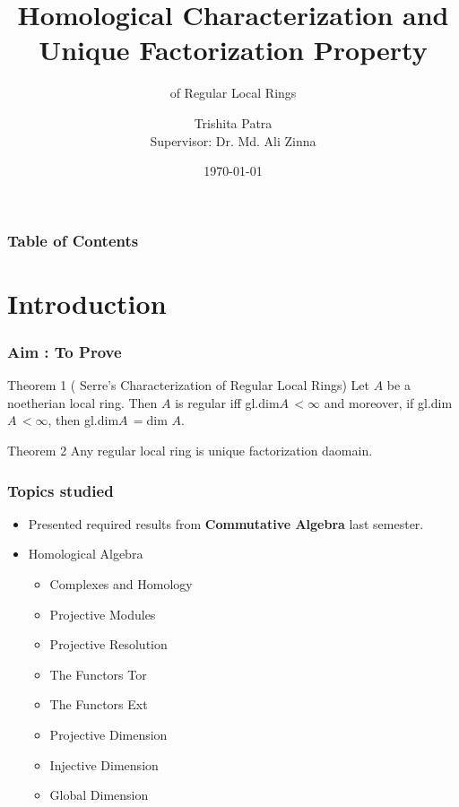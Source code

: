 \documentclass[
	11pt, %
]{beamer}
\title[Master's Thesis Presentation]{Homological Characterization and Unique Factorization Property}
\subtitle{ of Regular Local Rings }
\author[Trishita Patra]
{Trishita Patra\inst{} \\Supervisor: Dr. Md. Ali Zinna}
\institute[] %
{
  \inst{}%
  Department of Mathematics and Statistics (DMS)\\
  Indian Institute of Science Education and Research Kolkata (IISER Kolkata)
}
\date{\today }
\newcommand{\B}{\textbf}						%
\begin{document}
\frame{\titlepage}

\begin{frame}
\frametitle{Table of Contents}
\tableofcontents
\end{frame}

\section{Introduction}
\begin{frame}
\frametitle{Aim : To Prove}
\begin{block}{ Theorem 1 ( Serre's Characterization of Regular Local Rings)}
    Let $A$ be a noetherian local ring. Then $A$ is regular iff gl.dim$A\,<\infty$  and moreover, if gl.dim$A\,<\infty$, then gl.dim$A\,=$dim $A$.  
\end{block}
\pause
\vspace{0.5cm}
\begin{block}{ Theorem 2 }
    Any regular local ring is unique factorization daomain.
    
\end{block}
\end{frame}

\begin{frame}
\frametitle{ Topics studied}

\begin{itemize}
\renewcommand\labelitemi{--}
    \item Presented required results from \B{Commutative Algebra} last semester.
    \item Homological Algebra
    \begin{itemize}
    \renewcommand\labelitemi{--}
        \item Complexes and Homology
        \item Projective Modules
        \item Projective Resolution
        \item The Functors Tor
        \item The Functors Ext
        \item Projective Dimension
        \item Injective Dimension
        \item Global Dimension
    \end{itemize}
\end{itemize}
\end{frame}
\end{document}
